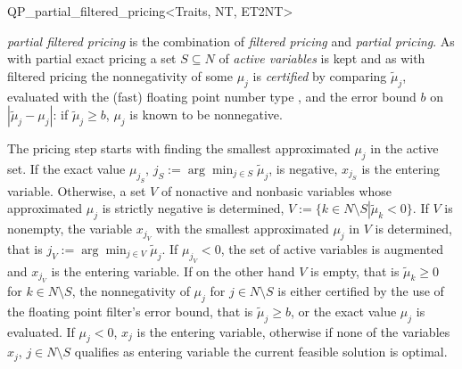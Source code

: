 
\begin{ccRefClass}{QP_partial_filtered_pricing<Traits, NT, ET2NT>}

\ccDefinition

\emph{partial filtered pricing} is the combination of \emph{filtered pricing}
and \emph{partial pricing}. As with partial exact pricing a set $S \subseteq N$
of \emph{active variables} is kept and as with filtered pricing
the nonnegativity of some $\mu_{j}$ is \emph{certified} by comparing
$\tilde{\mu}_{j}$, evaluated with the (fast) floating point number type
, and the error bound $b$ on
$\left|\tilde{\mu}_{j} - \mu_{j}\right|$: if $\tilde{\mu}_{j} \geq b$,
$\mu_{j}$ is known to be nonnegative.

The pricing step starts with finding the smallest approximated
$\mu_{j}$ in the active set. If the exact value $\mu_{j_{S}}$,
$j_{S}:=\arg\min_{j \in S}\tilde{\mu}_{j}$, is negative, $x_{j_{S}}$ is the
entering variable. Otherwise, a set $V$ of nonactive and nonbasic variables
whose approximated $\mu_{j}$ is strictly negative is determined,
$V:=\{k \in N \setminus S \left|\right. \tilde{\mu}_{k} < 0 \}$. If $V$ is
nonempty, the variable $x_{j_{V}}$ with the smallest approximated
$\mu_{j}$ in $V$ is determined, that is
$j_{V}:=\arg\min_{j \in V}\tilde{\mu}_{j}$. If $\mu_{j_{V}} < 0$, the set of active variables is
augmented and $x_{j_{V}}$ is the entering variable. If on the other hand $V$ is
empty, that is $\tilde{\mu}_{k} \geq 0$ for $k \in N \setminus S$, the
nonnegativity of $\mu_{j}$ for $j \in N \setminus S$ is either certified by the
use of the floating point filter's error bound, that is
$\tilde{\mu}_{j} \geq b$, or the exact value $\mu_{j}$ is evaluated. If
$\mu_{j} <0$, $x_{j}$ is the entering variable, otherwise if none of
the variables $x_{j}$, $j \in N \setminus S$ qualifies as entering variable the
current feasible solution is optimal.


\end{ccRefClass}
